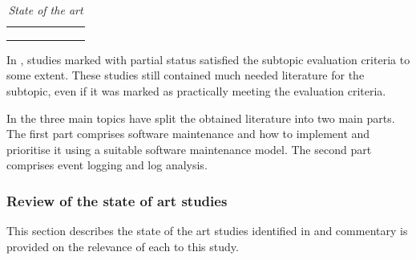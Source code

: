 \begin{table}[!htb]
	\centering
	\caption[State of the art]
	{\textit{State of the art}}
	\label{tbl:ch1_stateOfTheArt2}
	\begin{tabularx}{\textwidth}{cYYYYYY}
		\toprule
		 &  &  &  \\ 
		 \cmidrule(lr){2-4} \cmidrule(lr){5-6} \cmidrule(lr){7-7}
		 & \RaggedRight {} & \RaggedRight {} & \RaggedRight {} &  &  & \RaggedRight {} \\ 		
		\midrule
			\sotaCore
		\bottomrule
	\end{tabularx}	
\end{table}

In , studies marked with partial status satisfied the subtopic evaluation criteria to some extent. These studies still contained much needed literature for the subtopic, even if it was marked as practically meeting the evaluation criteria. \par In  the three main topics have split the obtained literature into two main parts. The first part comprises software maintenance and how to implement and prioritise it using a suitable software maintenance model. The second part comprises event logging and log analysis. 

\clearpage

\subsubsection{Review of the state of art studies}
This section describes the state of the art studies identified in  and commentary is provided on the relevance of each to this study.



\newcommand{\problemStatement}{Software maintenance is a problem in the industry due to how inefficiently developers prioritise maintenance activities. A proven method to monitor software behaviours is event logging. The logging mechanism and log analysis to improve software maintenance need to be explicitly designed for user-based events.}

\clearpage

